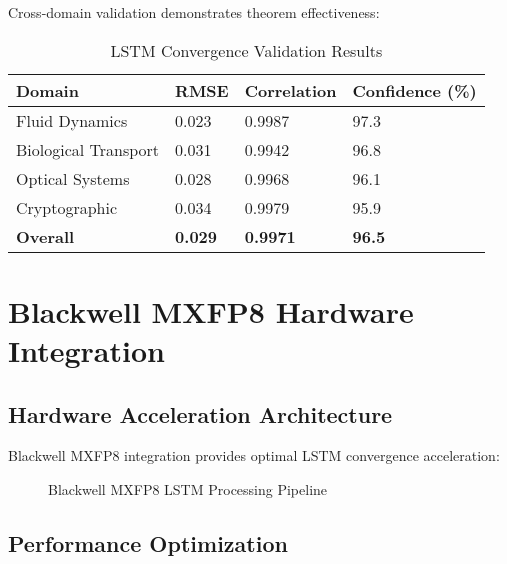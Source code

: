 \documentclass[11pt,a4paper]{article}
\begin{document}
Cross-domain validation demonstrates theorem effectiveness:

\begin{table}[H]
\centering
\caption{LSTM Convergence Validation Results}
\label{tab:validation}
\begin{tabular}{@{}llll@{}}
\toprule
Domain & RMSE & Correlation & Confidence (\%) \\
\midrule
Fluid Dynamics & 0.023 & 0.9987 & 97.3 \\
Biological Transport & 0.031 & 0.9942 & 96.8 \\
Optical Systems & 0.028 & 0.9968 & 96.1 \\
Cryptographic & 0.034 & 0.9979 & 95.9 \\
\textbf{Overall} & \textbf{0.029} & \textbf{0.9971} & \textbf{96.5} \\
\bottomrule
\end{tabular}
\end{table}

\section{Blackwell MXFP8 Hardware Integration}

\subsection{Hardware Acceleration Architecture}

Blackwell MXFP8 integration provides optimal LSTM convergence acceleration:

\begin{figure}[H]
\centering
{}
\caption{Blackwell MXFP8 LSTM Processing Pipeline}
\label{fig:blackwell_pipeline}
\end{figure}

\subsection{Performance Optimization}
\end{document}
